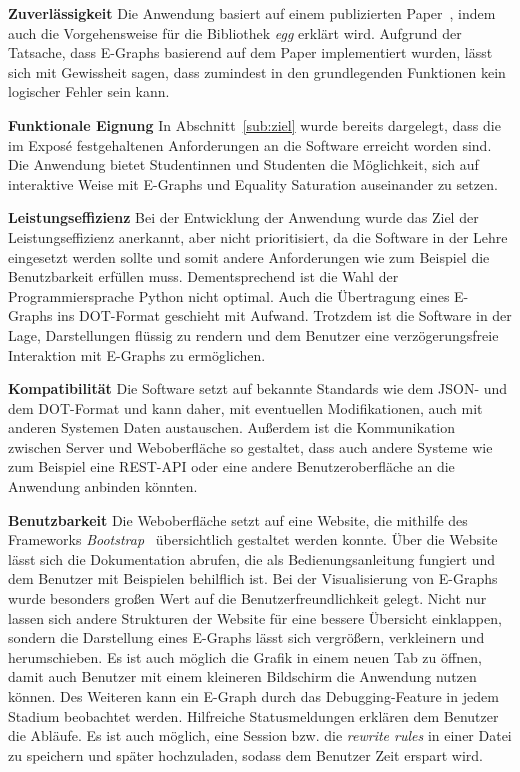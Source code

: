 \noindent\textbf{Zuverlässigkeit} Die Anwendung basiert auf einem publizierten Paper~\cite{2021-egg}, indem auch die Vorgehensweise für die Bibliothek \textit{egg} erklärt wird.
Aufgrund der Tatsache, dass E-Graphs basierend auf dem Paper implementiert wurden, lässt sich mit Gewissheit sagen, dass zumindest in den grundlegenden Funktionen kein logischer Fehler sein kann.



\noindent\textbf{Funktionale Eignung} In Abschnitt~\ref{sub:ziel} wurde bereits dargelegt, dass die im Exposé festgehaltenen Anforderungen an die Software erreicht worden sind.
Die Anwendung bietet Studentinnen und Studenten die Möglichkeit, sich auf interaktive Weise mit E-Graphs und Equality Saturation auseinander zu setzen.





\noindent\textbf{Leistungseffizienz} Bei der Entwicklung der Anwendung wurde das Ziel der Leistungseffizienz anerkannt, aber nicht prioritisiert, da die Software in der Lehre eingesetzt werden sollte
und somit andere Anforderungen wie zum Beispiel die Benutzbarkeit erfüllen muss. Dementsprechend ist die Wahl der Programmiersprache Python nicht optimal. Auch die Übertragung eines E-Graphs ins DOT-Format 
geschieht mit Aufwand. Trotzdem ist die Software in der Lage, Darstellungen flüssig zu rendern und dem Benutzer eine verzögerungsfreie Interaktion mit E-Graphs zu ermöglichen.

\noindent\textbf{Kompatibilität} Die Software setzt auf bekannte Standards wie dem JSON- und dem DOT-Format und kann daher, mit eventuellen Modifikationen, auch mit anderen Systemen Daten austauschen.
Außerdem ist die Kommunikation zwischen Server und Weboberfläche so gestaltet, dass auch andere Systeme wie zum Beispiel eine REST-API oder eine andere Benutzeroberfläche an die Anwendung anbinden könnten.

\noindent\textbf{Benutzbarkeit} Die Weboberfläche setzt auf eine Website, die mithilfe des Frameworks \textit{Bootstrap}~\cite{bootstrap} übersichtlich gestaltet werden konnte.
Über die Website lässt sich die Dokumentation abrufen, die als Bedienungsanleitung fungiert und dem Benutzer mit Beispielen behilflich ist.
Bei der Visualisierung von E-Graphs wurde besonders großen Wert auf die Benutzerfreundlichkeit gelegt. Nicht nur lassen sich andere Strukturen der Website für eine bessere Übersicht 
einklappen, sondern die Darstellung eines E-Graphs lässt sich vergrößern, verkleinern und herumschieben. Es ist auch möglich die Grafik in einem neuen Tab zu öffnen, damit auch Benutzer
mit einem kleineren Bildschirm die Anwendung nutzen können.
Des Weiteren kann ein E-Graph durch das Debugging-Feature in jedem Stadium beobachtet werden. Hilfreiche Statusmeldungen erklären dem Benutzer die Abläufe.
Es ist auch möglich, eine Session bzw. die \textit{rewrite rules} in einer Datei zu speichern und später hochzuladen, sodass dem Benutzer Zeit erspart wird.
